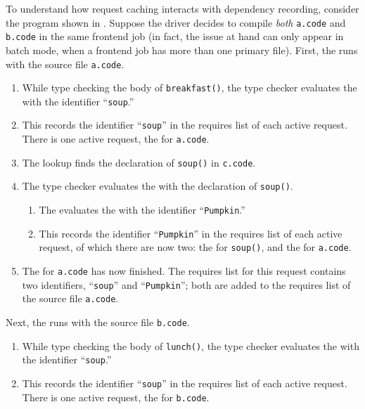 \documentclass[../generics]{subfiles}
\begin{document}
\begin{example}
To understand how request caching interacts with dependency recording, consider the program shown in . Suppose the driver decides to compile \emph{both} \texttt{a.code} and \texttt{b.code} in the same frontend job (in fact, the issue at hand can only appear in batch mode, when a frontend job has more than one primary file). First, the  runs with the source file \texttt{a.code}.
\begin{enumerate}
\item While type checking the body of \texttt{breakfast()}, the type checker evaluates the  with the identifier ``\texttt{soup}.''
\item This records the identifier ``\texttt{soup}'' in the requires list of each active request. There is one active request, the  for \texttt{a.code}.
\item The lookup finds the declaration of \texttt{soup()} in \texttt{c.code}.
\item The type checker evaluates the  with the declaration of \texttt{soup()}.
\begin{enumerate}
\item The  evaluates the  with the identifier ``\texttt{Pumpkin}.''
\item This records the identifier ``\texttt{Pumpkin}'' in the requires list of each active request, of which there are now two: the  for \texttt{soup()}, and the  for \texttt{a.code}.
\end{enumerate}
\item The  for \texttt{a.code} has now finished. The requires list for this request contains two identifiers, ``\texttt{soup}'' and ``\texttt{Pumpkin}''; both are added to the requires list of the source file \texttt{a.code}.
\end{enumerate}
Next, the  runs with the source file \texttt{b.code}.
\begin{enumerate}
\item While type checking the body of \texttt{lunch()}, the type checker evaluates the  with the identifier ``\texttt{soup}.''
\item This records the identifier ``\texttt{soup}'' in the requires list of each active request. There is one active request, the  for \texttt{b.code}.

\end{enumerate}
\end{example}
\end{document}
